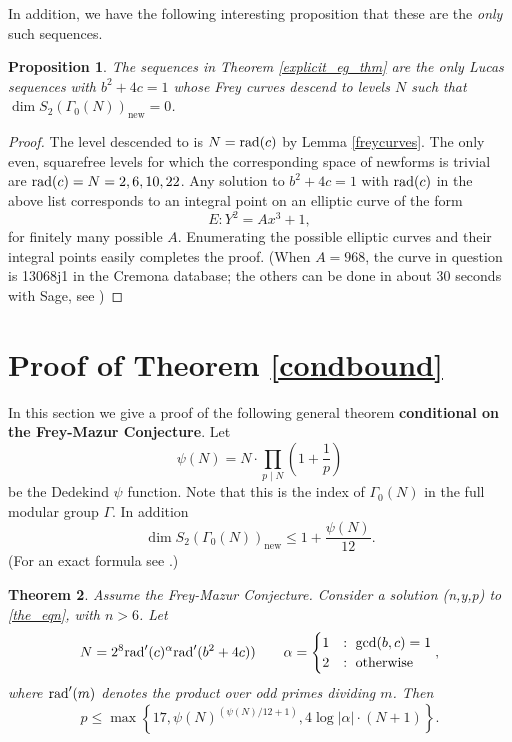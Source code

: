 \documentclass[12pt]{amsart}
\newtheorem{thm}{Theorem}[section]
\newtheorem{prop}[thm]{Proposition}
\theoremstyle{definition}
\theoremstyle{remark}
\newcommand{\rad}{{\rm{rad}}}
\begin{document}
In addition, we have the following interesting proposition that these are the \emph{only} such sequences.

\begin{prop}\label{onlyseqs}
The sequences in Theorem \ref{explicit_eg_thm} are the only Lucas sequences with $b^2+4c = 1$ whose Frey curves descend to levels $N$ such that $\dim S_2(\Gamma_0(N))_{\text{new}} = 0$.
\end{prop}
\begin{proof}
The level descended to is $N = \rad(c)$ by Lemma \ref{freycurves}.  The only even, squarefree levels for which the corresponding space of newforms is trivial are $\rad(c) = N = 2,6,10,22$.  Any solution to $b^2+4c = 1$ with $\rad(c)$ in the above list corresponds to an integral point on an elliptic curve of the form
\[ E \colon Y^2 = Ax^3+1, \]
for finitely many possible $A$.  Enumerating the possible elliptic curves and their integral points easily completes the proof. (When $A = 968$, the curve in question is 13068j1 in the Cremona database; the others can be done in about 30 seconds with Sage, see \cite{code})
\end{proof}

\section{Proof of Theorem \ref{condbound}}\label{genthmproof}

In this section we give a proof of the following general theorem \textbf{conditional on the Frey-Mazur Conjecture}.  Let 
\[\psi(N) = N \cdot \prod_{p \mid N} \left( 1 + \frac{1}{p} \right) \]
be the Dedekind $\psi$ function.  Note that this is the index of $\Gamma_0(N)$ in the full modular group $\Gamma$. In addition 
\[ \dim S_2(\Gamma_0(N))_{\text{new}} \leq 1 + \frac{\psi(N)}{12}. \]
(For an exact formula see \cite{stein07}.)

\begin{thm}\label{condbound_inplace}
Assume the Frey-Mazur Conjecture.  Consider a solution (n,y,p) to \eqref{the_eqn}, with $n > 6$. Let
\[ N = 2^8  {\rad}'(c)^\alpha\rad'(b^2+4c)) \qquad \alpha = \begin{cases} 1 & : \ \gcd(b,c)=1 \\ 2 & : \ \text{otherwise} \end{cases}, \]
where $\rad'(m)$ denotes the product over odd primes dividing $m$. Then 
\[ p \leq \max\left\{17,   \psi(N)^{(\psi(N)/12 + 1)}, 4\log{|\alpha|} \cdot ( N+1)  \right\}. \]
\end{thm}
\end{document}

